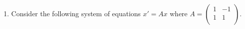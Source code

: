 \documentclass{article}
\begin{document}
\begin{enumerate}
\begin{enumerate}
	\item $\lambda_1=\lambda_2=2$.
	\item $\xi=\begin{bmatrix}1\\1\\\end{bmatrix}$ (eigenvector), $\eta=\begin{bmatrix}1\\0\end{bmatrix}$ (generalized eigenvector).
	\item General solution: $x(t)=c_1\begin{bmatrix}1\\1\end{bmatrix}e^{2t}+c_2\left(\begin{bmatrix}1\\1\end{bmatrix}te^{2t}+\begin{bmatrix}1\\0\end{bmatrix}e^{2t}\right)$.

	Particular solution: $x_p(t)=\begin{bmatrix}1\\1\end{bmatrix}e^{2t}+\begin{bmatrix}1\\1\end{bmatrix}te^{2t}+\begin{bmatrix}1\\0\end{bmatrix}e^{2t}$.
\end{enumerate}

\item Consider the following system of equations $x'=Ax$ where $
	A=\begin{pmatrix}
		 1 & -1\\
		 1 & 1\\
	\end{pmatrix}
$.


\end{enumerate}
\end{document}
